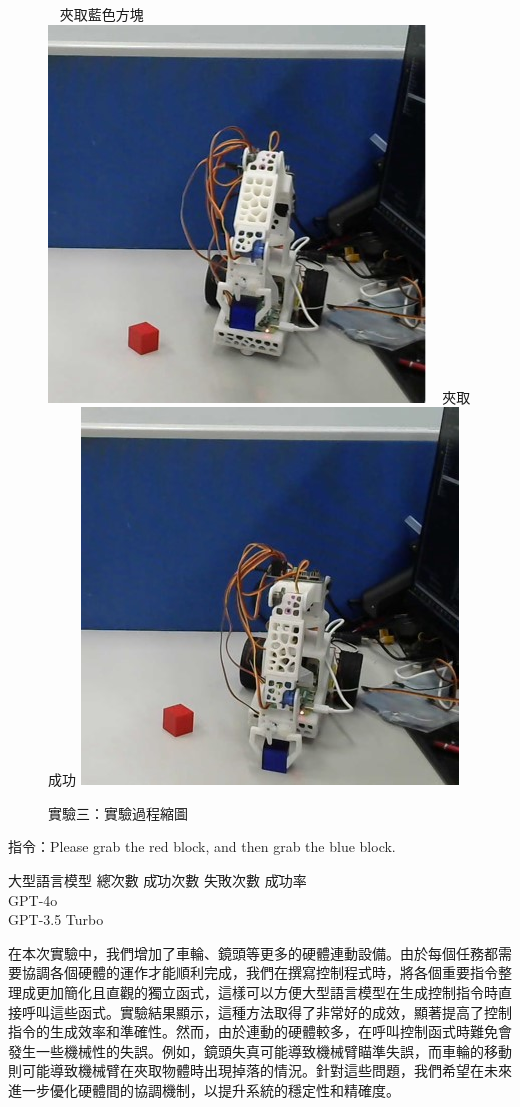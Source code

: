 \documentclass[class=NCU_thesis, crop=false]{standalone}
\begin{document}
\begin{figure}[!hbt]
    ~    
    \subcaptionbox
        {夾取藍色方塊
        \label{fig:fig-dataset-contrast-after-adjustment}}
        {\includegraphics[width=0.4\linewidth]{figures/Exp3 (6)_square.jpg}}
    ~
    \subcaptionbox
        {夾取成功
        \label{fig:fig-dataset-contrast-after-adjustment}}
        {\includegraphics[width=0.4\linewidth]{figures/Exp3 (7)_square.jpg}}   
\caption{實驗三：實驗過程縮圖}
\end{figure}

指令：Please grab the red block, and then grab the blue block.
\begin{tabbing}
    大型語言模型 \= 總次數 \= 成功次數 \= 失敗次數 \= 成功率 \\
    GPT-4o   \\
    GPT-3.5 Turbo    \\
\end{tabbing}

在本次實驗中，我們增加了車輪、鏡頭等更多的硬體連動設備。由於每個任務都需要協調各個硬體的運作才能順利完成，我們在撰寫控制程式時，將各個重要指令整理成更加簡化且直觀的獨立函式，這樣可以方便大型語言模型在生成控制指令時直接呼叫這些函式。實驗結果顯示，這種方法取得了非常好的成效，顯著提高了控制指令的生成效率和準確性。然而，由於連動的硬體較多，在呼叫控制函式時難免會發生一些機械性的失誤。例如，鏡頭失真可能導致機械臂瞄準失誤，而車輪的移動則可能導致機械臂在夾取物體時出現掉落的情況。針對這些問題，我們希望在未來進一步優化硬體間的協調機制，以提升系統的穩定性和精確度。
\end{document}
